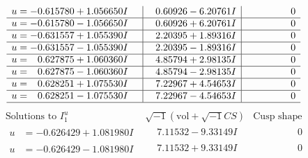 \documentclass[1p]{elsarticle_modified}
\theoremstyle{definition}
\newcommand{\I}{\sqrt{-1}}
\begin{document}
$$\begin{array}{c|c|c}
\begin{aligned}
u &= -0.615780 + 1.056650 I\end{aligned}
 & \phantom{-}0.60926 - 6.20761 I & \phantom{-0.000000 } 0 \\ \hline\begin{aligned}
u &= -0.615780 - 1.056650 I\end{aligned}
 & \phantom{-}0.60926 + 6.20761 I & \phantom{-0.000000 } 0 \\ \hline\begin{aligned}
u &= -0.631557 + 1.055390 I\end{aligned}
 & \phantom{-}2.20395 + 1.89316 I & \phantom{-0.000000 } 0 \\ \hline\begin{aligned}
u &= -0.631557 - 1.055390 I\end{aligned}
 & \phantom{-}2.20395 - 1.89316 I & \phantom{-0.000000 } 0 \\ \hline\begin{aligned}
u &= \phantom{-}0.627875 + 1.060360 I\end{aligned}
 & \phantom{-}4.85794 + 2.98135 I & \phantom{-0.000000 } 0 \\ \hline\begin{aligned}
u &= \phantom{-}0.627875 - 1.060360 I\end{aligned}
 & \phantom{-}4.85794 - 2.98135 I & \phantom{-0.000000 } 0 \\ \hline\begin{aligned}
u &= \phantom{-}0.628251 + 1.075530 I\end{aligned}
 & \phantom{-}7.22967 + 4.54653 I & \phantom{-0.000000 } 0 \\ \hline\begin{aligned}
u &= \phantom{-}0.628251 - 1.075530 I\end{aligned}
 & \phantom{-}7.22967 - 4.54653 I & \phantom{-0.000000 } 0\\
 \hline 
 \end{array}$$\newpage$$\begin{array}{c|c|c}  
\text{Solutions to }I^u_{1}& \I (\text{vol} + \sqrt{-1}CS) & \text{Cusp shape}\\
 \hline 
\begin{aligned}
u &= -0.626429 + 1.081980 I\end{aligned}
 & \phantom{-}7.11532 - 9.33149 I & \phantom{-0.000000 } 0 \\ \hline\begin{aligned}
u &= -0.626429 - 1.081980 I\end{aligned}
 & \phantom{-}7.11532 + 9.33149 I & \phantom{-0.000000 } 0 \\ \hline\begin{aligned}

\end{aligned}
\end{array}$$
\end{document}
